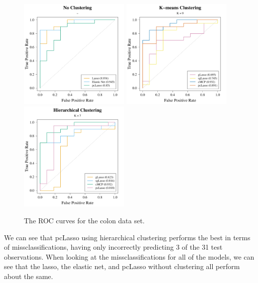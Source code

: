 \documentclass[11pt]{article}
\begin{document}
{\begin{landscape}
\begin{table}[p]
\end{table}

\vspace{0.5cm}

\begin{figure}[p]
    \centering
    \includegraphics[width = 0.475\textwidth]{colon_ROC_no_n.pdf}
    \includegraphics[width = 0.475\textwidth]{colon_ROC_k_n.pdf}
    \includegraphics[width = 0.475\textwidth]{colon_ROC_h_n.pdf}
    \caption{The ROC curves for the colon data set.}
    \label{colonROC}
\end{figure}

\end{landscape}
}

We can see that pcLasso using hierarchical clustering performs the best in terms of missclassifications, having only incorrectly predicting 3 of the 31 test observations. When looking at the missclassifications for all of the models, we can see that the lasso, the elastic net, and pcLasso without clustering all perform about the same. 
\end{document}
